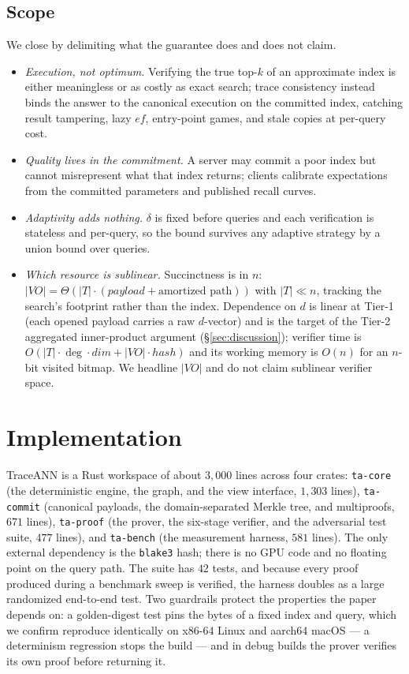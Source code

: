 \documentclass[11pt]{article}
\newcommand{\sys}{TraceANN}
\begin{document}
\subsection{Scope}

We close by delimiting what the guarantee does and does not claim.

\begin{itemize}
\item \emph{Execution, not optimum.} Verifying the true top-$k$ of an
  approximate index is either meaningless or as costly as exact search;
  trace consistency instead binds the answer to the canonical execution
  on the committed index, catching result tampering, lazy $\mathit{ef}$,
  entry-point games, and stale copies at per-query cost.
\item \emph{Quality lives in the commitment.} A server may commit a poor
  index but cannot misrepresent what that index returns; clients
  calibrate expectations from the committed parameters and published
  recall curves.
\item \emph{Adaptivity adds nothing.} $\delta$ is fixed before queries
  and each verification is stateless and per-query, so the bound
  survives any adaptive strategy by a union bound over queries.
\item \emph{Which resource is sublinear.} Succinctness is in $n$:
  $|\mathit{VO}|=\Theta(|T|\cdot(\mathit{payload}+\text{amortized
  path}))$ with $|T|\ll n$, tracking the search's footprint rather than
  the index. Dependence on $d$ is linear at Tier-1 (each opened payload
  carries a raw $d$-vector) and is the target of the Tier-2 aggregated
  inner-product argument (\S\ref{sec:discussion}); verifier time is
  $O(|T|\cdot\deg\cdot\mathit{dim}+|\mathit{VO}|\cdot\mathit{hash})$ and
  its working memory is $O(n)$ for an $n$-bit visited bitmap. We
  headline $|\mathit{VO}|$ and do not claim sublinear verifier space.
\end{itemize}

\section{Implementation}\label{sec:impl}

\sys{} is a Rust workspace of about $3{,}000$ lines across four crates:
\texttt{ta-core} (the deterministic engine, the graph, and the view
interface, $1{,}303$ lines), \texttt{ta-commit} (canonical payloads, the
domain-separated Merkle tree, and multiproofs, $671$ lines),
\texttt{ta-proof} (the prover, the six-stage verifier, and the
adversarial test suite, $477$ lines), and \texttt{ta-bench} (the
measurement harness, $581$ lines). The only external dependency is the
\texttt{blake3} hash; there is no GPU code and no floating point on the
query path. The suite has $42$ tests, and because every proof produced
during a benchmark sweep is verified, the harness doubles as a large
randomized end-to-end test. Two guardrails protect the properties the
paper depends on: a golden-digest test pins the bytes of a fixed index and query,
which we confirm reproduce identically on x86-64 Linux and aarch64
macOS --- a determinism regression stops the build --- and in debug builds the
prover verifies its own proof before returning it.
\end{document}
